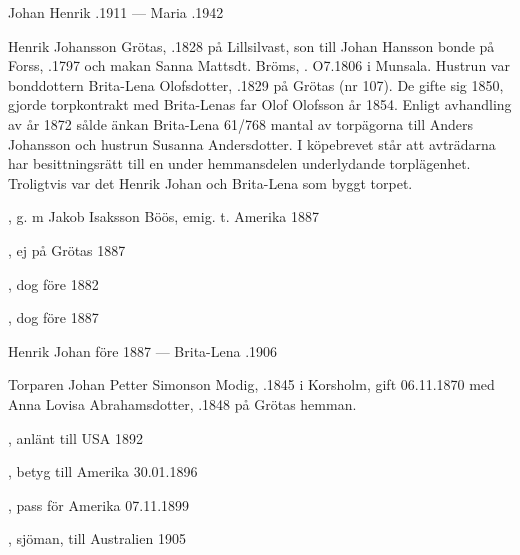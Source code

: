 Johan Henrik .1911  ---  Maria .1942


Henrik Johansson Grötas, .1828 på Lillsilvast, son till Johan Hansson bonde på Forss, .1797 och makan Sanna Mattsdt. Bröms, . O7.1806 i Munsala. Hustrun var bonddottern Brita-Lena Olofsdotter, .1829 på Grötas (nr 107). De gifte sig 1850, gjorde torpkontrakt med Brita-Lenas far Olof Olofsson år 1854. Enligt avhandling av år 1872 sålde änkan Brita-Lena 61/768 mantal av torpägorna till Anders Johansson och hustrun Susanna Andersdotter. I köpebrevet står att avträdarna har besittningsrätt till en under hemmansdelen underlydande torplägenhet. Troligtvis var det Henrik Johan och Brita-Lena som byggt torpet.
\begin{jhchildren}
  \item {}
  \item {}, g. m Jakob Isaksson Böös, emig. t. Amerika 1887
  \item {}
  \item {}
  \item {}
  \item {}, ej på Grötas 1887
  \item {}, dog före 1882
  \item {}, dog före 1887
\end{jhchildren}
Henrik Johan \textdied före 1887  ---  Brita-Lena .1906





Torparen Johan Petter Simonson Modig, .1845 i Korsholm, gift 06.11.1870 med Anna Lovisa Abrahamsdotter,  .1848 på Grötas hemman.
\begin{jhchildren}
  \item {}, anlänt till USA 1892
  \item {}, betyg till Amerika 30.01.1896
  \item {}, pass för Amerika 07.11.1899
  \item {}, sjöman, till Australien 1905
\end{jhchildren}

